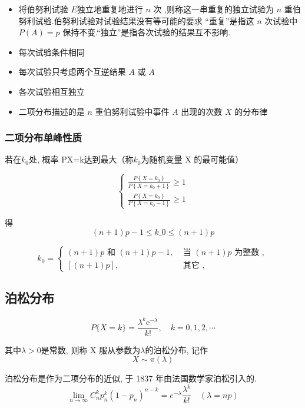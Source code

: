 \begin{itemize}
    \item 将伯努利试验 $E$独立地重复地进行 $n$ 次 ,则称这一串重复的独立试验为 $n$ 重伯努利试验.伯努利试验对试验结果没有等可能的要求 “重复”是指这 $n$ 次试验中 $P(A)= p$ 保持不变.“独立”是指各次试验的结果互不影响.
    \item 每次试验条件相同
    \item 每次试验只考虑两个互逆结果 $A$ 或 $\overline{A}$
    \item 各次试验相互独立
    \item 二项分布描述的是 $n$ 重伯努利试验中事件 $A$ 出现的次数 $X$ 的分布律
\end{itemize}

\subsubsection{二项分布单峰性质}

若在$k_0$处, 概率 P{X=k}达到最大（称$k_0$为随机变量 X 的最可能值）

$$
\left\{\begin{array}{l}
\frac{P\left\{X=k_{0}\right\}}{P\left\{X=k_{0}+1\right\}} \geq 1 \\
\frac{P\left\{X=k_{0}\right\}}{P\left\{X=k_{0}-1\right\}} \geq 1
\end{array}\right.
$$

得
$$ (n+1) p-1 \leq k\_{0} \leq(n+1) p $$

$$
k_{0}=\left\{\begin{array}{ll}
(n+1) p \text { 和 }(n+1) p-1, & \text { 当 }({n}+{1}) {p} \text { 为整数 }, \\
{[(n+1) p],} & \text { 其它 },
\end{array}\right.
$$

\subsection{泊松分布}

$$
{P}\{{X}={k}\}=\frac{\lambda^{k} \mathrm{e}^{-\lambda}}{{k} !}, \quad {k}={0}, {1}, {2}, \cdots
$$

其中$\lambda > 0$是常数, 则称 X 服从参数为$\lambda$的泊松分布, 记作
$$ X \sim \pi(\lambda) $$


\begin{theorem}[泊松定理]
    \label{thm:Poission}
泊松分布是作为二项分布的近似, 于 1837 年由法国数学家泊松引入的.
$$
\lim _{n \rightarrow \infty} C_{n}^{k} p_{n}^{k}\left(1-p_{n}\right)^{n-k}=e^{-\lambda} \frac{\lambda^{k}}{k !}\quad (\lambda = np)
$$
\end{theorem}

